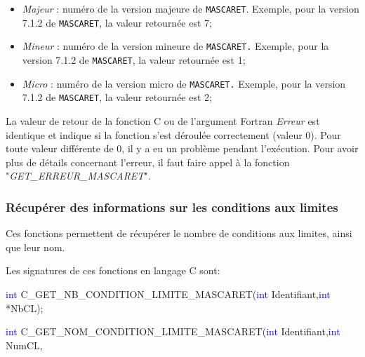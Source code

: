 \documentclass[a4paper,11pt]{article}
\begin{document}
  \begin{itemize}
  
     \item \textit{Majeur} : num\'ero de la version majeure de \texttt{MASCARET}. Exemple, pour la version 7.1.2 de \texttt{MASCARET}, la valeur retourn\'ee est 7;
     
     \vspace{0.5cm}
     
     \item \textit{Mineur} : num\'ero de la version mineure de \texttt{MASCARET.} Exemple, pour la version 7.1.2 de \texttt{MASCARET}, la valeur retourn\'ee est 1;
     
     \vspace{0.5cm}
     
     \item \textit{Micro} : num\'ero de la version micro de \texttt{MASCARET.} Exemple, pour la version 7.1.2 de \texttt{MASCARET}, la valeur retourn\'ee est 2;
    
  \end{itemize}

 \vspace{0.5cm}

 La valeur de retour de la fonction C ou de l'argument Fortran \textit{Erreur} est identique et indique si la fonction s'est d\'eroul\'ee correctement (valeur 0). Pour toute valeur diff\'erente de 0, il y a eu un probl\`eme pendant l'ex\'ecution. Pour avoir plus de d\'etails concernant l'erreur, il faut faire appel \`a la fonction "\textit{GET\_ERREUR\_MASCARET}".

\subsubsection{R\'ecup\'erer des informations sur les conditions aux limites}

 Ces fonctions permettent de r\'ecup\'erer le nombre de conditions aux limites, ainsi que leur nom.
 
 \vspace{0.5cm}
 
  Les signatures de ces fonctions en langage C sont:
 
 \vspace{0.5cm}
 
 \textcolor{blue}{int} C\_GET\_NB\_CONDITION\_LIMITE\_MASCARET(\textcolor{blue}{int} Identifiant,\textcolor{blue}{int} *NbCL);
 
 \textcolor{blue}{int} C\_GET\_NOM\_CONDITION\_LIMITE\_MASCARET(\textcolor{blue}{int} Identifiant,\textcolor{blue}{int} NumCL,
 
\end{document}

